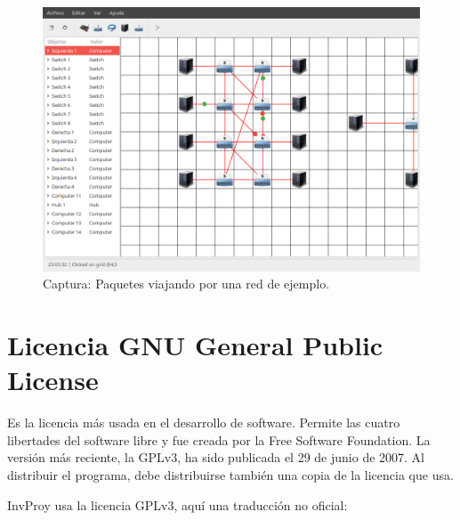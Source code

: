 \documentclass[a4paper, 11pt]{report} %
\begin{document}
\begin{figure}[H]
\includegraphics[width=\textwidth]{Resources/Screenshots/2016-09-12-230644_1000x700_scrot.png}
\caption{Captura: Paquetes viajando por una red de ejemplo.}
\label{fig:samplenet}
\end{figure}

\chapter[Licencia GNU GPL]{Licencia GNU General Public License}
\label{gnugpl}
Es la licencia más usada en el desarrollo de software. Permite las cuatro libertades del software libre y fue creada por la Free Software Foundation. La versión más reciente, la GPLv3, ha sido publicada el 29 de junio de 2007. Al distribuir el programa, debe distribuirse también una copia de la licencia que usa. 

InvProy usa la licencia GPLv3, aquí una traducción no oficial\cite{gpltranslation}:
\inputminted[baselinestretch=1, fontsize=\scriptsize, linenos, breaklines]{text}{GPLv3-spanish.txt}



\newpage
\thispagestyle{empty}
\vspace*{\fill}
\doclicenseThis
\vspace*{\fill}
\end{document}
